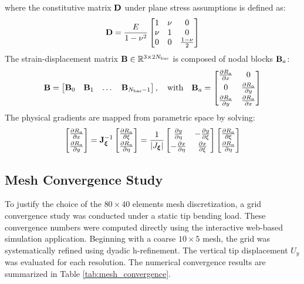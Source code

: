 where the constitutive matrix $\mathbf{D}$ under plane stress assumptions is defined as:
\begin{equation}
    \mathbf{D} = \frac{E}{1 - \nu^2} \begin{bmatrix} 1 & \nu & 0 \\ \nu & 1 & 0 \\ 0 & 0 & \frac{1 - \nu}{2} \end{bmatrix}
\end{equation}
The strain-displacement matrix $\mathbf{B} \in \mathbb{R}^{3 \times 2N_{\text{bas}}}$ is composed of nodal blocks $\mathbf{B}_a$:
\begin{equation}
    \mathbf{B} = \begin{bmatrix} \mathbf{B}_0 & \mathbf{B}_1 & \dots & \mathbf{B}_{N_{\text{bas}}-1} \end{bmatrix}, \quad \text{with} \quad \mathbf{B}_a = \begin{bmatrix} \frac{\partial R_a}{\partial x} & 0 \\[0.3em] 0 & \frac{\partial R_a}{\partial y} \\[0.3em] \frac{\partial R_a}{\partial y} & \frac{\partial R_a}{\partial x} \end{bmatrix}
\end{equation}
The physical gradients are mapped from parametric space by solving:
\begin{equation}
    \label{eq:iga_jacobian}
    \begin{bmatrix} \frac{\partial R_a}{\partial x} \\[0.3em] \frac{\partial R_a}{\partial y} \end{bmatrix} = \mathbf{J}_{\boldsymbol{\xi}}^{-1} \begin{bmatrix} \frac{\partial R_a}{\partial \xi} \\[0.3em] \frac{\partial R_a}{\partial \eta} \end{bmatrix} = \frac{1}{|J_{\boldsymbol{\xi}}|} \begin{bmatrix} \frac{\partial y}{\partial \eta} & -\frac{\partial y}{\partial \xi} \\[0.3em] -\frac{\partial x}{\partial \eta} & \frac{\partial x}{\partial \xi} \end{bmatrix} \begin{bmatrix} \frac{\partial R_a}{\partial \xi} \\[0.3em] \frac{\partial R_a}{\partial \eta} \end{bmatrix}
\end{equation}

\subsection{Mesh Convergence Study}
To justify the choice of the $80 \times 40$ elements mesh discretization, a grid convergence study was conducted under a static tip bending load. These convergence numbers were computed directly using the interactive web-based simulation application. Beginning with a coarse $10 \times 5$ mesh, the grid was systematically refined using dyadic h-refinement. The vertical tip displacement $U_y$ was evaluated for each resolution. The numerical convergence results are summarized in Table \ref{tab:mesh_convergence}.

